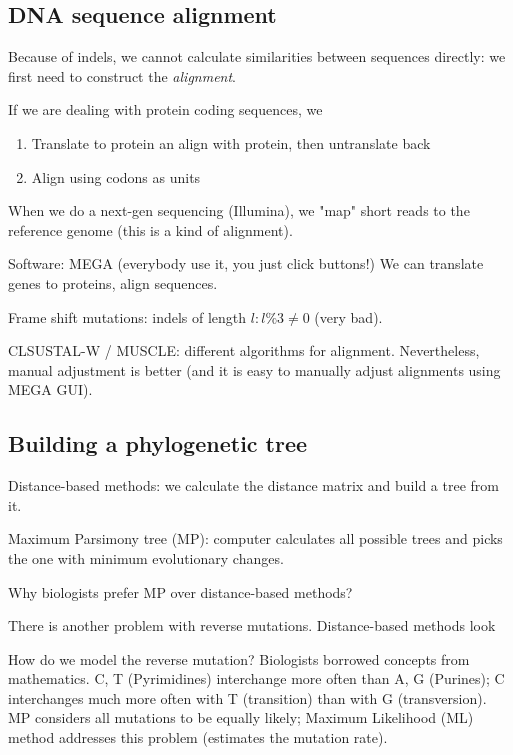 \documentclass[main.tex]{subfiles}
\begin{document}
\subsection{DNA sequence alignment}

Because of indels, we cannot calculate similarities between sequences directly: we first need to construct the \emph{alignment}.

If we are dealing with protein coding sequences, we
\begin{enumerate}[noitemsep]
	\item Translate to protein an align with protein, then untranslate back
	\item Align using codons as units 
\end{enumerate}

When we do a next-gen sequencing (Illumina), we "map" short reads to the reference genome (this is a kind of alignment).

Software: MEGA (everybody use it, you just click buttons!)
We can translate genes to proteins, align sequences.

Frame shift mutations: indels of length $ l : l\%3 \ne 0 $ (very bad).

CLSUSTAL-W / MUSCLE: different algorithms for alignment.
Nevertheless, manual adjustment is better (and it is easy to manually adjust alignments using MEGA GUI).

\subsection{Building a phylogenetic tree}

Distance-based methods: we calculate the distance matrix and build a tree from it.

Maximum Parsimony tree (MP): computer calculates all possible trees and picks the one with minimum evolutionary changes.

Why biologists prefer MP over distance-based methods?

There is another problem with reverse mutations.
Distance-based methods look

How do we model the reverse mutation?
Biologists borrowed concepts from mathematics. %
C, T (Pyrimidines) interchange more often than A, G (Purines); C interchanges much more often with T (transition) than with G (transversion).
MP considers all mutations to be equally likely; Maximum Likelihood (ML) method addresses this problem (estimates the mutation rate).
\end{document}
